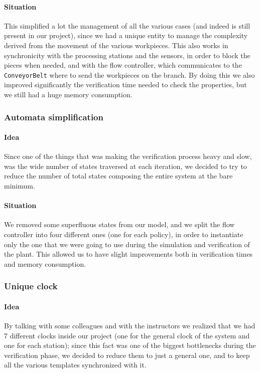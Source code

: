 \documentclass[a4paper]{article}
\begin{document}
    \paragraph{Situation} This simplified a lot the management of all the various cases (and indeed is still present in our project), since we had a unique entity to manage the complexity derived from the movement of the various workpieces. This also works in synchronicity with the processing stations and the sensors, in order to block the pieces when needed, and with the flow controller, which communicates to the \texttt{ConveyorBelt} where to send the workpieces on the branch. By doing this we also improved significantly the verification time needed to check the properties, but we still had a huge memory consumption.

    \subsubsection{Automata simplification}

    \paragraph{Idea} Since one of the things that was making the verification process heavy and slow, was the wide number of states traversed at each iteration, we decided to try to reduce the number of total states composing the entire system at the bare minimum.

    \paragraph{Situation} We removed some superfluous states from our model, and we split the flow controller into four different ones (one for each policy), in order to instantiate only the one that we were going to use during the simulation and verification of the plant. This allowed us to have slight improvements both in verification times and memory consumption.

    \subsubsection{Unique clock}

    \paragraph{Idea} By talking with some colleagues and with the instructors we realized that we had 7 different clocks inside our project (one for the general clock of the system and one for each station); since this fact was one of the biggest bottlenecks during the verification phase, we decided to reduce them to just a general one, and to keep all the various templates synchronized with it.
\end{document}
